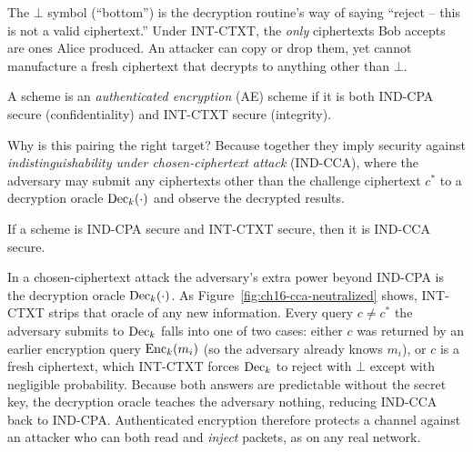 The $\bot$ symbol (``bottom'') is the decryption routine's way of saying ``reject -- this is not a valid ciphertext.'' Under INT-CTXT, the \emph{only} ciphertexts Bob accepts are ones Alice produced. An attacker can copy or drop them, yet cannot manufacture a fresh ciphertext that decrypts to anything other than $\bot$.

\begin{definition}
\label{ch16:ae-def}
A scheme is an \emph{authenticated encryption} (AE) scheme if it is both IND-CPA secure (confidentiality) and INT-CTXT secure (integrity).
\end{definition}

Why is this pairing the right target? Because together they imply security against \emph{indistinguishability under chosen-ciphertext attack} (IND-CCA), where the adversary may submit any ciphertexts other than the challenge ciphertext $c^*$ to a decryption oracle $\operatorname{Dec}_k(\cdot)$ and observe the decrypted results.

\begin{theorem}
\label{ch16:ae-implies-cca}
If a scheme is IND-CPA secure and INT-CTXT secure, then it is IND-CCA secure.
\end{theorem}

\begin{whybox}
In a chosen-ciphertext attack the adversary's extra power beyond IND-CPA is the decryption oracle $\operatorname{Dec}_k(\cdot)$. As Figure~\ref{fig:ch16-cca-neutralized} shows, INT-CTXT strips that oracle of any new information. Every query $c \neq c^*$ the adversary submits to $\operatorname{Dec}_k$ falls into one of two cases: either $c$ was returned by an earlier encryption query $\operatorname{Enc}_k(m_i)$ (so the adversary already knows $m_i$), or $c$ is a fresh ciphertext, which INT-CTXT forces $\operatorname{Dec}_k$ to reject with $\bot$ except with negligible probability. Because both answers are predictable without the secret key, the decryption oracle teaches the adversary nothing, reducing IND-CCA back to IND-CPA. Authenticated encryption therefore protects a channel against an attacker who can both read and \emph{inject} packets, as on any real network.
\end{whybox}

